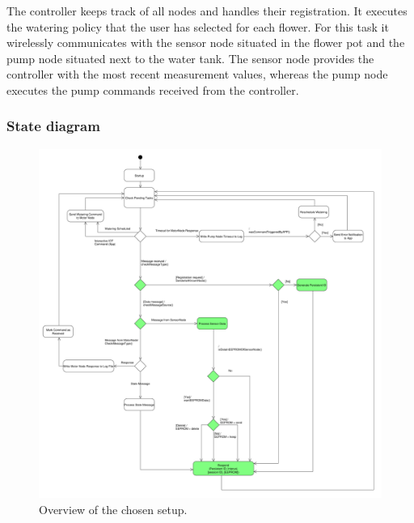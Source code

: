 The controller keeps track of all nodes and handles their registration.
It executes the watering policy that the user has selected for each flower.
For this task it wirelessly communicates with the sensor node situated in the flower pot and the pump node situated next to the water tank. The sensor node provides the controller with the most recent measurement values, whereas the pump node executes the pump commands received from the controller.

\subsubsection{State diagram}

\begin{figure}[h!]
	\begin{center}
	\includegraphics[scale=0.24]{../ControlNode_Diagramm.pdf}
	\caption{Overview of the chosen setup.}
	\label{Setup_overview}
	\end{center}
\end{figure}


